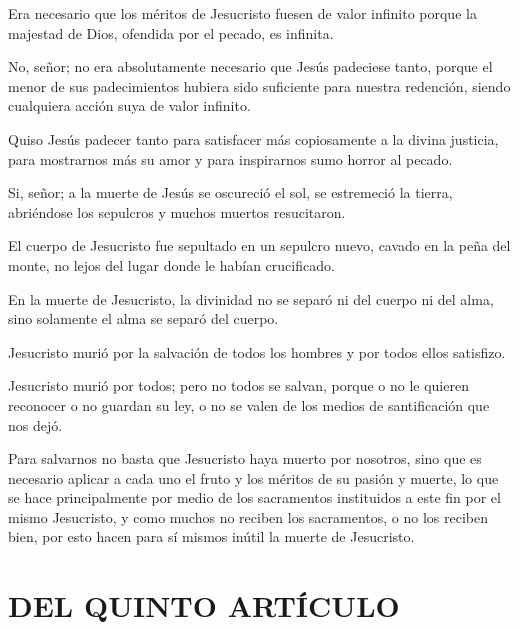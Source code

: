  Era necesario que los méritos de Jesucristo fuesen de valor infinito
porque la majestad de Dios, ofendida por el pecado, es infinita.

 No, señor; no era
absolutamente necesario que Jesús padeciese tanto, porque el menor de sus
padecimientos hubiera sido suficiente para nuestra redención, siendo cualquiera
acción suya de valor infinito.

 Quiso Jesús padecer tanto
para satisfacer más copiosamente a la divina justicia, para mostrarnos más su
amor y para inspirarnos sumo horror al pecado.

 Si, señor; a la
muerte de Jesús se oscureció el sol, se estremeció la tierra, abriéndose los
sepulcros y muchos muertos resucitaron.

 El cuerpo de Jesucristo
fue sepultado en un sepulcro nuevo, cavado en la peña del monte, no lejos del
lugar donde le habían crucificado.

 En la muerte de Jesucristo, la divinidad no se separó ni del cuerpo
ni del alma, sino solamente el alma se separó del cuerpo.

 Jesucristo murió por la salvación de todos
los hombres y por todos ellos satisfizo.

 Jesucristo murió por todos; pero no todos se salvan, porque o no le
quieren reconocer o no guardan su ley, o no se valen de los medios de
santificación que nos dejó.

 Para
salvarnos no basta que Jesucristo haya muerto por nosotros, sino que es necesario
aplicar a cada uno el fruto y los méritos de su pasión y muerte, lo que se hace
principalmente por medio de los sacramentos instituidos a este fin por el mismo
Jesucristo, y como muchos no reciben los sacramentos, o no los reciben bien, por
esto hacen para sí mismos inútil la muerte de Jesucristo.

\section{DEL QUINTO ARTÍCULO}


